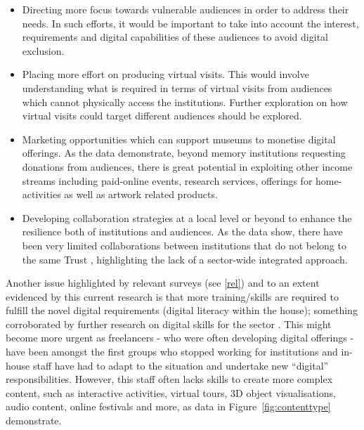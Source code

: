 \documentclass{egpubl}
\begin{document}
\begin{itemize}
\item Directing more focus towards vulnerable audiences in order to address their needs. In such efforts, it would be important to take into account the interest, requirements and digital capabilities of these audiences to avoid digital exclusion.
\item Placing more effort on producing virtual visits. This would involve understanding what is required in terms of virtual visits from audiences which cannot physically access the institutions. Further exploration on how virtual visits could target different audiences should be explored.
\item Marketing opportunities which can support museums to monetise digital offerings. As the data demonstrate, beyond memory institutions requesting donations from audiences, there is great potential in exploiting other income streams including paid-online events, research services, offerings for home-activities as well as artwork related products.
\item Developing collaboration strategies at a local level or beyond to enhance the resilience both of institutions and audiences. As the data show, there have been very limited collaborations between institutions that do not belong to the same Trust \cite{FrankLloydWrightFoundation2020}, highlighting the lack of a sector-wide integrated approach. 
\end{itemize}

Another issue highlighted by relevant surveys (see \ref{rel}) and to an extent evidenced by this current research is that more training/skills are required to fulfill the novel digital requirements (digital literacy within the house); something corroborated by further research on digital skills for the sector \cite{Parry2018}. This might become more urgent as freelancers - who were often developing digital offerings - have been amongst the first groups who stopped working for institutions and in-house staff have had to adapt to the situation and undertake new ``digital'' responsibilities. However, this staff often lacks skills to create more complex content, such as interactive activities, virtual tours, 3D object visualisations, audio content, online festivals and more, as data in Figure~\ref{fig:contenttype} demonstrate.
\end{document}
